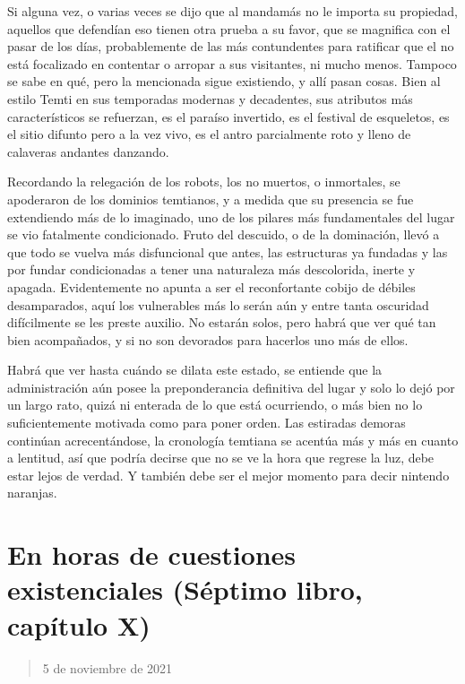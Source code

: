 \documentclass[
  spanish,
]{book}
\begin{document}
Si alguna vez, o varias veces se dijo que al mandamás no le importa su propiedad, aquellos que defendían eso tienen otra prueba a su favor, que se magnifica con el pasar de los días, probablemente de las más contundentes para ratificar que el no está focalizado en contentar o arropar a sus visitantes, ni mucho menos. Tampoco se sabe en qué, pero la mencionada sigue existiendo, y allí pasan cosas. Bien al estilo Temti en sus temporadas modernas y decadentes, sus atributos más característicos se refuerzan, es el paraíso invertido, es el festival de esqueletos, es el sitio difunto pero a la vez vivo, es el antro parcialmente roto y lleno de calaveras andantes danzando.

Recordando la relegación de los robots, los no muertos, o inmortales, se apoderaron de los dominios temtianos, y a medida que su presencia se fue extendiendo más de lo imaginado, uno de los pilares más fundamentales del lugar se vio fatalmente condicionado. Fruto del descuido, o de la dominación, llevó a que todo se vuelva más disfuncional que antes, las estructuras ya fundadas y las por fundar condicionadas a tener una naturaleza más descolorida, inerte y apagada. Evidentemente no apunta a ser el reconfortante cobijo de débiles desamparados, aquí los vulnerables más lo serán aún y entre tanta oscuridad difícilmente se les preste auxilio. No estarán solos, pero habrá que ver qué tan bien acompañados, y si no son devorados para hacerlos uno más de ellos.

Habrá que ver hasta cuándo se dilata este estado, se entiende que la administración aún posee la preponderancia definitiva del lugar y solo lo dejó por un largo rato, quizá ni enterada de lo que está ocurriendo, o más bien no lo suficientemente motivada como para poner orden. Las estiradas demoras continúan acrecentándose, la cronología temtiana se acentúa más y más en cuanto a lentitud, así que podría decirse que no se ve la hora que regrese la luz, debe estar lejos de verdad. Y también debe ser el mejor momento para decir nintendo naranjas.

\hypertarget{en-horas-de-cuestiones-existenciales-suxe9ptimo-libro-capuxedtulo-x}{%
\section{En horas de cuestiones existenciales (Séptimo libro, capítulo X)}\label{en-horas-de-cuestiones-existenciales-suxe9ptimo-libro-capuxedtulo-x}}

\begin{quote}
5 de noviembre de 2021
\end{quote}
\end{document}
